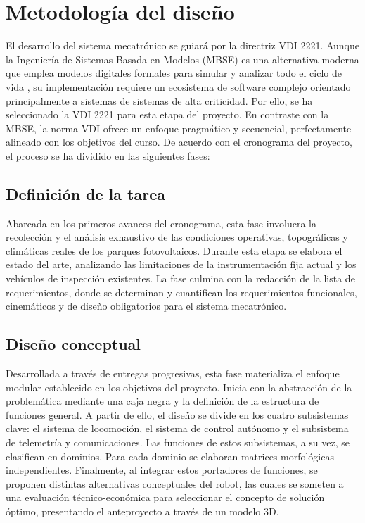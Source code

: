 \section{Metodología del diseño} 

El desarrollo del sistema mecatrónico se guiará por la directriz VDI 2221. Aunque la Ingeniería de Sistemas Basada en Modelos (MBSE) es una alternativa moderna que emplea modelos digitales formales para simular y analizar todo el ciclo de vida \citep{Isdefe2023}, su implementación requiere un ecosistema de software complejo orientado principalmente a sistemas de sistemas de alta criticidad. Por ello, se ha seleccionado la VDI 2221 para esta etapa del proyecto. En contraste con la MBSE, la norma VDI ofrece un enfoque pragmático y secuencial, perfectamente alineado con los objetivos del curso. De acuerdo con el cronograma del proyecto, el proceso se ha dividido en las siguientes fases:

\subsection{Definición de la tarea} 
Abarcada en los primeros avances del cronograma, esta fase involucra la recolección y el análisis exhaustivo de las condiciones operativas, topográficas y climáticas reales de los parques fotovoltaicos. Durante esta etapa se elabora el estado del arte, analizando las limitaciones de la instrumentación fija actual y los vehículos de inspección existentes. La fase culmina con la redacción de la lista de requerimientos, donde se determinan y cuantifican los requerimientos funcionales, cinemáticos y de diseño obligatorios para el sistema mecatrónico.

\subsection{Diseño conceptual} 

Desarrollada a través de entregas progresivas, esta fase materializa el enfoque modular establecido en los objetivos del proyecto. Inicia con la abstracción de la problemática mediante una caja negra y la definición de la estructura de funciones general. A partir de ello, el diseño se divide en los cuatro subsistemas clave: el sistema de locomoción, el sistema de control autónomo y el subsistema de telemetría y comunicaciones. Las funciones de estos subsistemas, a su vez, se clasifican en dominios. Para cada dominio se elaboran matrices morfológicas independientes. Finalmente, al integrar estos portadores de funciones, se proponen distintas alternativas conceptuales del robot, las cuales se someten a una evaluación técnico-económica para seleccionar el concepto de solución óptimo, presentando el anteproyecto a través de un modelo 3D.

